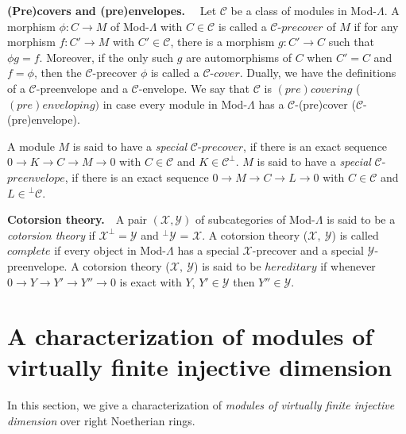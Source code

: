\documentclass[11pt,a4paper]{article}
\begin{document}
{\bf   (Pre)covers and (pre)envelopes.} \ \ Let $\mathscr{C}$    be a  class of modules in  Mod-$\Lambda$.
A  morphism $\phi: C\rightarrow M$ of Mod-$\Lambda$ with $C\in \mathscr{C}$ is called a  $\mathscr{C}$-$precover$ \cite{eno5} of $M$ if for any
morphism $f: C'\rightarrow M$ with $C'\in \mathscr{C}$,
there is a morphism $g : C'\rightarrow C$ such that $\phi g = f$. Moreover, if the only such $g$ are automorphisms of $C$ when
$C'= C$ and $f= \phi $, then the $\mathscr{C}$-precover $\phi$ is
called a $ \mathscr{C}$-$cover$. Dually, we have the
definitions of a  $\mathscr{C}$-preenvelope and a $\mathscr{C}$-envelope. We say that $\mathscr{C}$ is $(pre)covering$
($(pre)enveloping)$ in case every module in  Mod-$\Lambda$  has a $\mathscr{C}$-(pre)cover ($\mathscr{C}$-(pre)envelope).

A  module $M$ is said to have a  {\it special}  $\mathscr{C}$-$precover$, if there is an  exact sequence  $ 0
\rightarrow K\rightarrow C\rightarrow M\rightarrow 0$  with $C\in
\mathscr{C}$ and $K\in
{\mathscr {C}}^\perp$.  $M$ is said to have a  {\it special}  $\mathscr{C}$-$preenvelope$, if there is an  exact sequence  $ 0
\rightarrow M\rightarrow C\rightarrow L\rightarrow 0$  with $C\in
\mathscr{C}$ and $L\in
{^\perp {\mathscr{C}}}$.
\\
\par
{\bf   Cotorsion  theory.}\ \ A pair $(\mathscr{X},\mathscr{Y})$  of subcategories of  Mod-$\Lambda$   is said to be  a  {\it cotorsion  theory} \cite{eno5} if ${\mathscr{X}}^\perp = {\mathscr{Y}}
 $ and $^\perp{\mathscr {Y}}$ = ${\mathscr {X}}$. A cotorsion theory (${\mathscr{X},\ \mathscr{Y}}$)
 is called $complete$   if every object in  Mod-$\Lambda$   has a   special  ${\mathscr{X}}$-precover
and  a   special  $\mathscr
{Y}$-preenvelope.  A
cotorsion theory (${\mathscr{X},\ \mathscr{Y}}$)
 is said to be  $ hereditary$   if whenever
 $0\rightarrow Y\rightarrow Y'\rightarrow
Y''\rightarrow 0$ is exact with $Y$, $Y'\in {\mathscr{Y}}$
then $Y''\in {\mathscr{Y}}$.

\medskip

\section{ A characterization of    modules of  virtually finite  injective
  dimension}


In this section, we   give a characterization of  {\it modules of  virtually finite  injective
  dimension} \cite{bel} over  right Noetherian rings.
\end{document}
